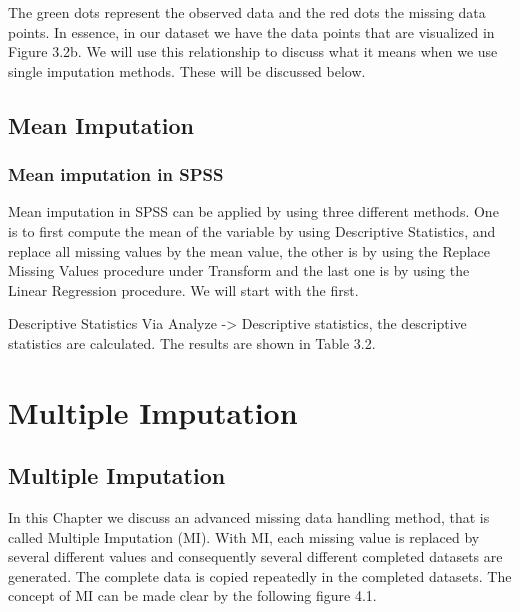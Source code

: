 \documentclass[]{book}
\begin{document}
The green dots represent the observed data and the red dots the missing
data points. In essence, in our dataset we have the data points that are
visualized in Figure 3.2b. We will use this relationship to discuss what
it means when we use single imputation methods. These will be discussed
below.

\section{Mean Imputation}\label{mean-imputation}

\subsection{Mean imputation in SPSS}\label{mean-imputation-in-spss}

Mean imputation in SPSS can be applied by using three different methods.
One is to first compute the mean of the variable by using Descriptive
Statistics, and replace all missing values by the mean value, the other
is by using the Replace Missing Values procedure under Transform and the
last one is by using the Linear Regression procedure. We will start with
the first.

Descriptive Statistics Via Analyze -\textgreater{} Descriptive
statistics, the descriptive statistics are calculated. The results are
shown in Table 3.2.

\chapter{Multiple Imputation}\label{multiple-imputation}

\section{Multiple Imputation}\label{multiple-imputation-1}

In this Chapter we discuss an advanced missing data handling method,
that is called Multiple Imputation (MI). With MI, each missing value is
replaced by several different values and consequently several different
completed datasets are generated. The complete data is copied repeatedly
in the completed datasets. The concept of MI can be made clear by the
following figure 4.1.
\end{document}
